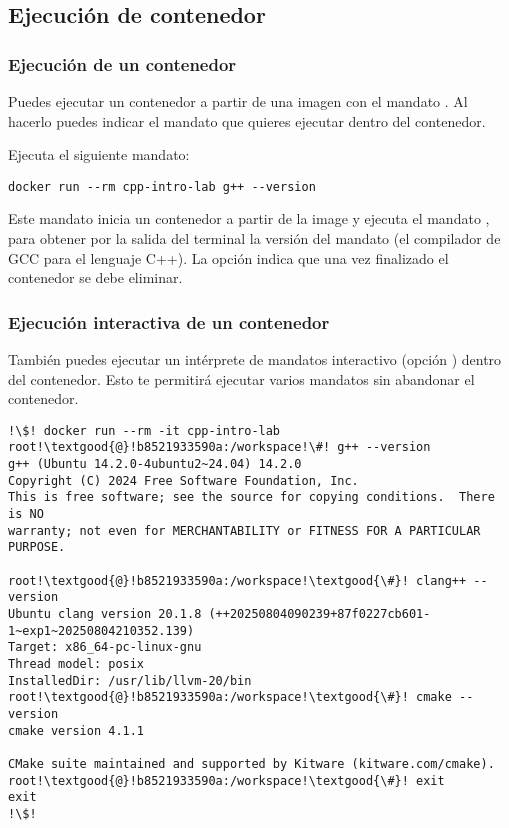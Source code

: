 \subsection{Ejecución de contenedor}

\subsubsection{Ejecución de un contenedor}

Puedes ejecutar un contenedor a partir de una imagen con el mandato 
. Al hacerlo puedes indicar el mandato que quieres
ejecutar dentro del contenedor.

Ejecuta el siguiente mandato:

\begin{lstlisting}[style=terminal]
docker run --rm cpp-intro-lab g++ --version
\end{lstlisting}

Este mandato inicia un contenedor a partir de la image 
y ejecuta el mandato , para obtener por la salida del
terminal la versión del mandato  (el compilador de GCC para el
lenguaje C++). La opción  indica que una vez finalizado el
contenedor se debe eliminar.

\subsubsection{Ejecución interactiva de un contenedor}

También puedes ejecutar un intérprete de mandatos interactivo (opción
) dentro del contenedor. Esto te permitirá ejecutar varios
mandatos sin abandonar el contenedor.

\begin{lstlisting}[style=terminal,escapechar=!]
!\$! docker run --rm -it cpp-intro-lab
root!\textgood{@}!b8521933590a:/workspace!\#! g++ --version
g++ (Ubuntu 14.2.0-4ubuntu2~24.04) 14.2.0
Copyright (C) 2024 Free Software Foundation, Inc.
This is free software; see the source for copying conditions.  There is NO
warranty; not even for MERCHANTABILITY or FITNESS FOR A PARTICULAR PURPOSE.

root!\textgood{@}!b8521933590a:/workspace!\textgood{\#}! clang++ --version
Ubuntu clang version 20.1.8 (++20250804090239+87f0227cb601-1~exp1~20250804210352.139)
Target: x86_64-pc-linux-gnu
Thread model: posix
InstalledDir: /usr/lib/llvm-20/bin
root!\textgood{@}!b8521933590a:/workspace!\textgood{\#}! cmake --version
cmake version 4.1.1

CMake suite maintained and supported by Kitware (kitware.com/cmake).
root!\textgood{@}!b8521933590a:/workspace!\textgood{\#}! exit
exit
!\$!
\end{lstlisting}

